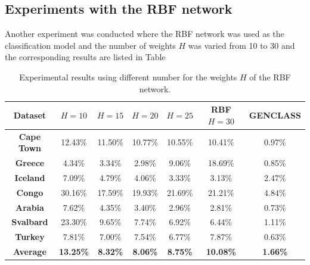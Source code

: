 \documentclass[12pt]{Definitions/academia}
\begin{document}
\clearpage
\subsection{\textmd{Experiments with the RBF network}}

Another experiment was conducted where the RBF network was used as
the classification model and the number of weights $H$ was varied
from 10 to 30 and the corresponding results are listed in Table

\begin{table}[H]
	\centering
\begin{tabular}{|c|c|c|c|c|c|c|}
\hline
\textbf{Dataset} &
\centering
$H=10$
 &
\centering
$H=15$
 &
\centering
$H=20$
 &
\centering
$H=25$
 &
\centering
RBF
$H=30$
 & GENCLASS\tabularnewline
\hline
\hline
\textbf{Cape Town} & 12.43\% & 11.50\% & 10.77\% & 10.55\% & 10.41\% & 0.97\%\tabularnewline
\hline
\textbf{Greece} & 4.34\% & 3.34\% & 2.98\% & 9.06\% & 18.69\% & 0.85\%\tabularnewline
\hline
\textbf{Iceland} & 7.09\% & 4.79\% & 4.06\% & 3.33\% & 3.13\% & 2.47\%\tabularnewline
\hline
\textbf{Congo} & 30.16\% & 17.59\% & 19.93\% & 21.69\% & 21.21\% & 4.84\%\tabularnewline
\hline
\textbf{Arabia} & 7.62\% & 4.35\% & 3.40\% & 2.96\% & 2.81\% & 0.73\%\tabularnewline
\hline
\textbf{Svalbard} & 23.30\% & 9.65\% & 7.74\% & 6.92\% & 6.44\% & 1.11\%\tabularnewline
\hline
\textbf{Turkey} & 7.81\% & 7.00\% & 7.54\% & 6.77\% & 7.87\% & 0.63\%\tabularnewline
\hline
\textbf{Average} & \textbf{13.25\%} & \textbf{8.32\%} & \textbf{8.06\%} & \textbf{8.75\%} & \textbf{10.08\%} & \textbf{1.66\%}\tabularnewline
\hline
\end{tabular}
\vspace{1em}
\caption{Experimental results using different number for the weights $H$ of
the RBF network.\label{tab:Table-9-Experimental-RBF-results-using}}
\end{table}
\end{document}
